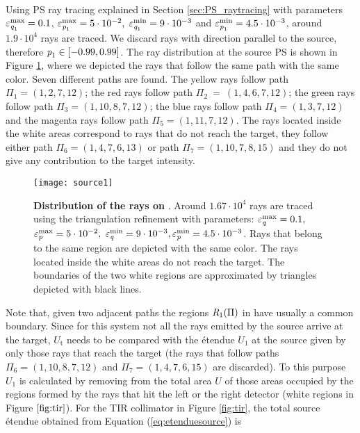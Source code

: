 \\ \indent
Using PS ray tracing explained in Section \ref{sec:PS_raytracing} with parameters $\varepsilon_{\textit{q}_1}^{\textrm{max}} = 0.1$, $ \varepsilon_{\textit{p}_1}^\textrm{max} = 5\cdot 10^{-2}, $ $\varepsilon_{\textit{q}_1}^\textrm{min} = 9\cdot 10^{-3}$ and $\varepsilon_{\textit{p}_1}^\textrm{min} = 4.5 \cdot 10^{-3}$, around $1.9 \cdot 10^4$ rays are traced. 
We discard rays with direction parallel to the source, therefore $\textit{p}_1 \in [-0.99, 0.99]$. The ray distribution at the source PS  is shown in Figure \ref{fig:sourcePS}, where we depicted the rays that follow the same path with the same color. Seven different paths are found. The yellow rays follow path $\Pi_1 = (1, 2, 7, 12)$;
   the red rays follow path $\Pi_2 ~= ~(1, 4, 6, 7, 12)$; the green rays follow path $\Pi_3 = (1, 10, 8, 7, 12)$;
   the blue rays follow path $\Pi_4= (1, 3, 7, 12)$ and the magenta rays follow path $\Pi_5= (1, 11, 7, 12)$. The rays located inside the white areas correspond to rays that do not reach the target, they follow either path $\Pi_6 = (1, 4, 7, 6, 13)$ or path $\Pi_7 = (1,10,7,8,15)$ and they do not give any contribution to the target intensity.
\begin{figure}[h]
  \begin{center}
  \texttt{[image: source1]}
  \end{center}
  \caption{\textbf{Distribution of the rays on }. Around $1.67 \cdot 10^4$ rays are traced using the triangulation refinement with parameters:
  $\varepsilon_{\textit{q}}^\textrm{max} = 0.1 ,$ $ \varepsilon_{\textit{p}}^\textrm{max} = 5\cdot 10^{-2}, $ $\varepsilon_{\textit{q}}^\textrm{min} = 9\cdot 10^{-3}, \varepsilon_{\textit{p}}^\textrm{min} = 4.5 \cdot 10^{-3}$. Rays that belong to the same region are depicted with the same color. The rays located inside the white areas do not reach the target. The boundaries of the two white regions are approximated by triangles depicted with black lines.}
  \label{fig:sourcePS}
\end{figure}
Note that, given two adjacent paths the regions $\mbox{$\emph{R}_{\textit{$1$}}$}(\Pi)$ in  have usually a common boundary. 
Since for this system not all the rays emitted by the source arrive at the target, $U_{\textrm{t}}$ needs to be compared with the \'{e}tendue $U_1$ at the source given by only those rays that reach the target (the rays that follow paths $\Pi_6=(1,10,8,7,12)$ and 
$\Pi_7 = (1,4,7,6,15)$ are discarded). To this purpose $U_1$ is calculated by removing from the total area $U$ of  those areas occupied by the regions formed by the rays that hit the left or the right detector (white regions in Figure $\ref{fig:tir}$).  For the TIR collimator in Figure \ref{fig:tir}, the total source  \'{e}tendue obtained from Equation (\ref{eq:etenduesource}) is
